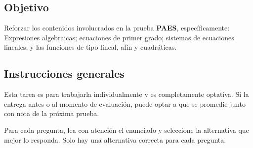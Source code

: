 \documentclass[
  titulo=Tarea,
  subtitulo=Álgebra y funciones,
  curso=Tercero medio,
  con nombre,
]{srs3}
\begin{document}
\subsection*{Objetivo}
Reforzar los contenidos involucrados en la prueba \textbf{PAES}, específicamente:
Expresiones algebraicas; ecuaciones de primer grado; sistemas de ecuaciones
lineales; y las funciones de tipo lineal, afín y cuadráticas.

\subsection*{Instrucciones generales}
Esta tarea es para trabajarla individualmente y es completamente optativa. Si
la entrega antes o al momento de evaluación, puede optar a que se promedie
junto con nota de la próxima prueba.

Para cada pregunta, lea con atención el enunciado y seleccione la
alternativa que mejor lo responda. Solo hay una alternativa
correcta para cada pregunta.
\end{document}
